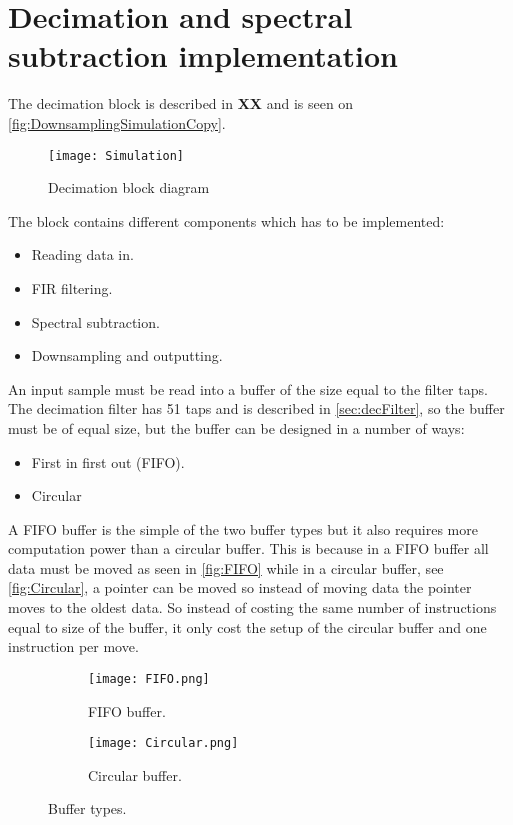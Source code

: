 \section{Decimation and spectral subtraction implementation}
The decimation block is described in \textbf{XX} and is seen on \autoref{fig:DownsamplingSimulationCopy}.
\begin{figure}[H]
    \centering
	\texttt{[image: Simulation]}
    \caption{Decimation block diagram}
    \label{fig:DownsamplingSimulationCopy}
\end{figure}
The block contains different components which has to be implemented:
\begin{itemize}
\item Reading data in.
\item FIR filtering.
\item Spectral subtraction.
\item Downsampling and outputting. 
\end{itemize}
An input sample must be read into a buffer of the size equal to the filter taps. The decimation filter has 51 taps and is described in \autoref{sec:decFilter}, so the buffer must be of equal size, but the buffer can be designed in a number of ways:
\begin{itemize}
\item First in first out (FIFO).
\item Circular
\end{itemize} 
A FIFO buffer is the simple of the two buffer types but it also requires more computation power than a circular buffer. This is because in a FIFO buffer all data must be moved as seen in \autoref{fig:FIFO} while in a circular buffer, see \autoref{fig:Circular}, a pointer can be moved so instead of moving data the pointer moves to the oldest data. So instead of costing the same number of instructions equal to size of the buffer, it only cost the setup of the circular buffer and one instruction per move.   
\begin{figure}[H]
\centering
\begin{subfigure}[t]{0.49\textwidth}
    \centering
	\texttt{[image: FIFO.png]}
	\caption{FIFO buffer.}
	\label{fig:FIFO}
\end{subfigure}
\begin{subfigure}[t]{0.49\textwidth}
    \centering
	\texttt{[image: Circular.png]}
	\caption{Circular buffer.}
	\label{fig:Circular}
\end{subfigure}
\caption{Buffer types.}
\label{fig:bufTypes}
\end{figure}
